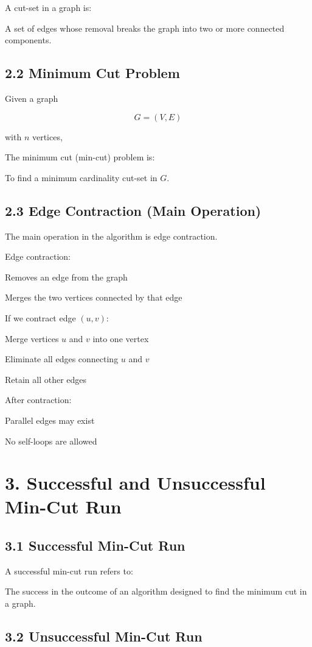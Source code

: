 \documentclass[12pt]{article}
\begin{document}
A cut-set in a graph is:

A set of edges whose removal breaks the graph into two or more connected components.

\subsection*{2.2 Minimum Cut Problem}

Given a graph

\[
G = (V, E)
\]

with \( n \) vertices,

The minimum cut (min-cut) problem is:

To find a minimum cardinality cut-set in \( G \).

\subsection*{2.3 Edge Contraction (Main Operation)}

The main operation in the algorithm is edge contraction.

Edge contraction:

Removes an edge from the graph

Merges the two vertices connected by that edge

If we contract edge \( (u, v) \):

Merge vertices \( u \) and \( v \) into one vertex

Eliminate all edges connecting \( u \) and \( v \)

Retain all other edges

After contraction:

Parallel edges may exist

No self-loops are allowed

\section*{3. Successful and Unsuccessful Min-Cut Run}

\subsection*{3.1 Successful Min-Cut Run}

A successful min-cut run refers to:

The success in the outcome of an algorithm designed to find the minimum cut in a graph.

\subsection*{3.2 Unsuccessful Min-Cut Run}
\end{document}
